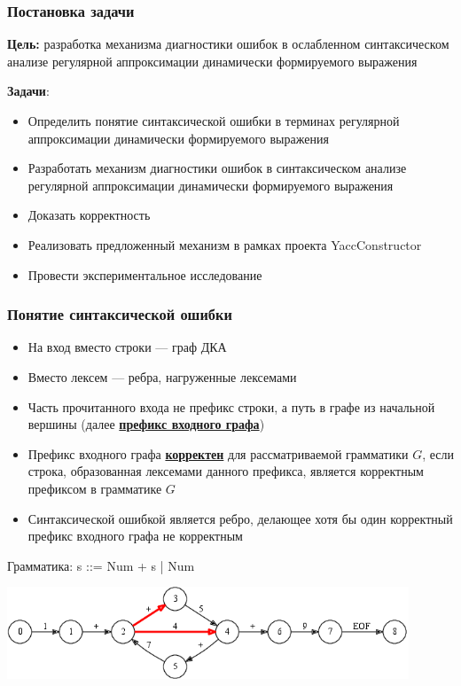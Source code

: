 \documentclass{beamer}
\begin{document}
\begin{frame}
  \transwipe[direction=90]
  \frametitle{Постановка задачи}
  \textbf{Цель:} разработка механизма диагностики ошибок в ослабленном синтаксическом анализе регулярной аппроксимации динамически формируемого выражения 

  \textbf{Задачи}:
  \begin{itemize}
    \item Определить понятие синтаксической ошибки в терминах регулярной аппроксимации динамически формируемого выражения
    \item Разработать механизм диагностики ошибок в синтаксическом анализе регулярной аппроксимации динамически формируемого выражения
    \item Доказать корректность
    \item Реализовать предложенный механизм в рамках проекта YaccConstructor
    \item Провести экспериментальное исследование
  \end{itemize}
\end{frame}

\begin{frame}[fragile]
	\transwipe[direction=90]
	\frametitle{Понятие синтаксической ошибки}
    \begin{itemize}
        \item На вход вместо строки --- граф ДКА
        \item Вместо лексем --- ребра, нагруженные лексемами
    	\item Часть прочитанного входа не префикс строки, а путь в графе из начальной вершины (далее \uline{\textbf{префикс входного графа}})
    	\item Префикс входного графа \uline{\textbf{корректен}} для рассматриваемой грамматики $G$, если строка, образованная лексемами данного префикса, является корректным префиксом в грамматике $G$
    	\item Синтаксической ошибкой является ребро, делающее хотя бы один корректный префикс входного графа не корректным
	\end{itemize}
	Грамматика: s ::= Num + s | Num
	\begin{center}
	            \includegraphics[width=340pt]{pictures/ErrorEdges.png}
	\end{center}
\end{frame}
\end{document}
